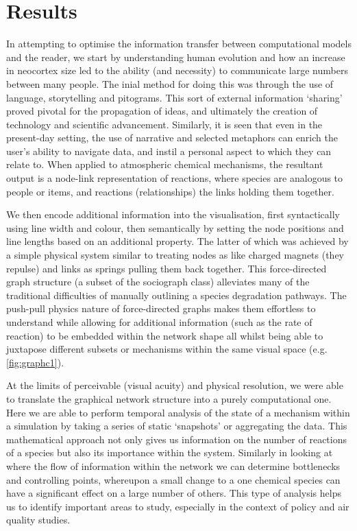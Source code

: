 \section{Results}

In attempting to optimise the information transfer between computational models and the reader, we start by understanding human evolution and how an increase in neocortex size led to the ability (and necessity) to communicate large numbers between many people. The inial method for doing this was through the use of language, storytelling and pitograms. This sort of external information `sharing' proved pivotal for the propagation of ideas, and ultimately the creation of technology and scientific advancement. Similarly, it is seen that even in the present-day setting, the use of narrative and selected metaphors can enrich the user's ability to navigate data, and instil a personal aspect to which they can relate to. When applied to atmospheric chemical mechanisms, the resultant output is a node-link representation of reactions, where species are analogous to people or items, and reactions (relationships) the links holding them together.

\newpage

We then encode additional information into the visualisation, first syntactically  using line width and colour, then semantically by setting the node positions and line lengths based on an additional property. The latter of which was achieved by a simple physical system similar to treating nodes as like charged magnets (they repulse) and links as springs pulling them back together. This force-directed graph structure (a subset of the sociograph class) alleviates many of the traditional difficulties of manually outlining a species degradation pathways. The push-pull physics nature of force-directed graphs makes them effortless to understand while allowing for additional information (such as the rate of reaction) to be embedded within the network shape all whilst being able to juxtapose different subsets or mechanisms within the same visual space (e.g. \autoref{fig:graphc1}).

At the limits of perceivable (visual acuity) and physical resolution, we were able to translate the graphical network structure into a purely computational one. Here we are able to perform temporal analysis of the state of a mechanism within a simulation by taking a series of static `snapshots' or aggregating the data. This mathematical approach not only gives us information on the number of reactions of a species but also its importance within the system. Similarly in looking at where the flow of information within the network we can determine bottlenecks and controlling points, whereupon a small change to a one chemical species can have a significant effect on a large number of others. This type of analysis helps us to identify important areas to study, especially in the context of policy and air quality studies.

